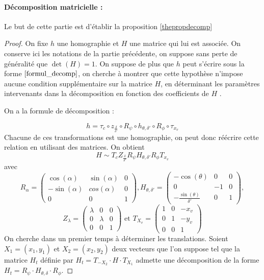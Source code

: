 \paragraph{Décomposition matricielle :}
Le but de cette partie est d'établir la proposition \ref{thepropdecomp}
\begin{proof}
On fixe $h$ une homographie et $H$ une matrice qui lui est associée. On conserve ici les notations de la partie précédente, on suppose sans perte de généralité que $\det (H)=1$. On suppose de plus que $h$ peut s'écrire sous la forme $\ref{formul_decomp}$, on cherche à montrer que cette hypothèse n'impose aucune condition supplémentaire sur la matrice $H$, en déterminant les paramètres intervenants dans la décomposition en fonction des coefficients de $H$ .

On a la formule de décomposition :

\begin{equation*}
h= \tau_{c} \circ z_{\frac{\delta}{\delta'}}\circ R_{\psi} \circ h_{\theta,\delta'} \circ R_{\phi} \circ \tau_{x_{v}}
\end{equation*}
Chacune de ces transformations est une homographie, on peut donc réécrire cette relation en utilisant des matrices. On obtient 
 \begin{equation*}
H\sim T_{c} Z_{\frac{\delta}{\delta'}}  R_{\psi}  H_{\theta,\delta'} R_{\phi}  T_{x_{v}}
\end{equation*}
avec
\begin{equation*}
R_{\alpha}=\begin{pmatrix}
\cos(\alpha)&\sin(\alpha)&0\\-\sin(\alpha)&cos(\alpha)&0\\0&0&1
\end{pmatrix}
, H_{\theta,\delta'}=\begin{pmatrix}
-\cos(\theta)&0&0\\0&-1&0\\-\frac{\sin(\theta)}{\delta'}&0&1
\end{pmatrix},
\end{equation*}
\begin{equation*}
Z_{\lambda}=\begin{pmatrix}
\lambda&0&0\\0&\lambda&0\\0&0&1
\end{pmatrix}
\text{ et } T_{X_{v}}=\begin{pmatrix}
1&0&-x_{v}\\0&1&-y_{v}\\0&0&1
\end{pmatrix}
\end{equation*}
 On cherche dans un premier temps à déterminer les translations. Soient $X_1 = (x_1 , y_1 )$ et $X_2 = (x_2 , y_2 )$ deux vecteurs que l'on suppose tel que la matrice $H_t$ définie par $H_t = T_{-X_2}  \cdot H \cdot T_{X_1}$ admette une décomposition de la forme  $H_t=R_{\psi} \cdot H_{\theta,\delta} \cdot R_{\phi}$.
 

\end{proof}
